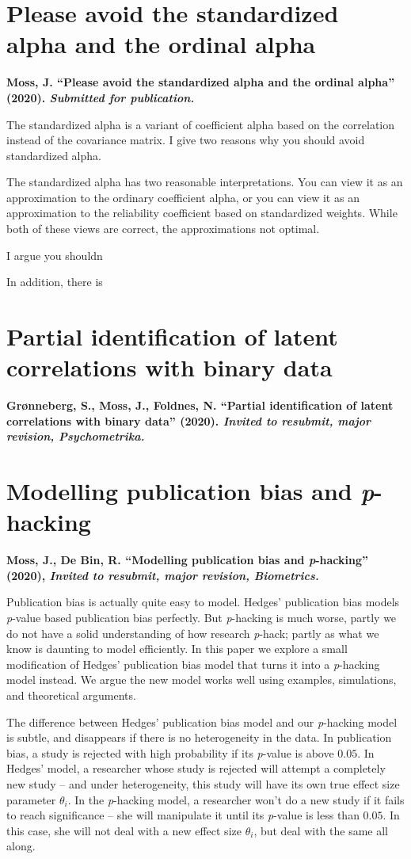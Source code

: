 \section{Please avoid the standardized alpha and the ordinal alpha}
\textbf{Moss, J. ``Please avoid the standardized alpha and the ordinal alpha''
(2020). \emph{Submitted for publication.}}

The standardized alpha is a variant of coefficient alpha based on the correlation instead of the covariance matrix. I give two reasons why you should avoid standardized alpha. 

The standardized alpha has two reasonable interpretations. You can view it as an approximation to the ordinary coefficient alpha, or you can view it as an approximation to the reliability coefficient based on standardized weights. While both of these views are correct, the approximations not optimal.

I argue you shouldn

In addition, there is 

\section{Partial identification of
latent correlations with binary data}
\textbf{Grønneberg, S., Moss, J., Foldnes, N. ``Partial identification of
latent correlations with binary data'' (2020). \emph{Invited to resubmit, major revision, Psychometrika.}}



\section{Modelling publication bias and \emph{p}-hacking}
\textbf{Moss, J., De Bin, R. ``Modelling publication bias and \emph{p}-hacking''
(2020), \emph{Invited to resubmit, major revision, Biometrics.}}

Publication bias is actually quite easy to model. Hedges' publication bias \parencite{Hedges1992-ue} models \textit{p}-value based publication bias perfectly. But \textit{p}-hacking is much worse, partly we do not have a solid understanding of how research \textit{p}-hack; partly as what we know is daunting to model efficiently. In this paper we explore a small modification of Hedges' publication bias model that turns it into a \textit{p}-hacking model instead. We argue the new model works well using examples, simulations, and theoretical arguments. 

The difference between Hedges' publication bias model and our \textit{p}-hacking model is subtle, and disappears if there is no heterogeneity in the data. In publication bias, a study is rejected with high probability if its \textit{p}-value is above $0.05$. In Hedges' model, a researcher whose study is rejected will attempt a completely new study -- and under heterogeneity, this study will have its own true effect size parameter $\theta_i$. In the \textit{p}-hacking model, a researcher won't do a new study if it fails to reach significance -- she will manipulate it until its \textit{p}-value is less than $0.05$. In this case, she will not deal with a new effect size $\theta_i$, but deal with the same all along.  

